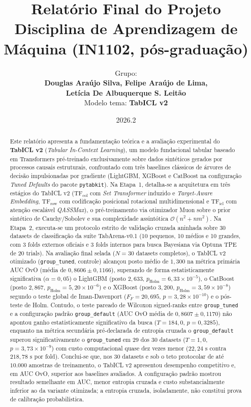 \documentclass[11pt,a4paper]{article}
\title{\bfseries Relatório Final do Projeto\\[0.3em]
       \large Disciplina de Aprendizagem de Máquina (IN1102, pós-graduação)}
\author{Grupo:\\[0.15em]
        \textbf{Douglas Araújo Silva, Felipe Araújo de Lima,}\\
        \textbf{Letícia De Albuquerque S. Leitão}\\[0.2em]
        Modelo tema: \textbf{TabICL v2}}
\date{2026.2}
\begin{document}
\maketitle
\thispagestyle{empty}

\begin{abstract}
\noindent
Este relatório apresenta a fundamentação teórica e a avaliação experimental do \textbf{TabICL v2} (\emph{Tabular In-Context Learning}), um modelo fundacional tabular baseado em Transformers pré-treinado exclusivamente sobre dados sintéticos gerados por processos causais estruturais, confrontado com três baselines clássicos de árvores de decisão impulsionadas por gradiente (LightGBM, XGBoost e CatBoost na configuração \emph{Tuned Defaults} do pacote \texttt{pytabkit}). Na Etapa~1, detalha-se a arquitetura em três estágios do TabICL v2 ($\mathrm{TF}_{\mathrm{col}}$ com \emph{Set Transformer} induzido e \emph{Target-Aware Embedding}, $\mathrm{TF}_{\mathrm{row}}$ com codificação posicional rotacional multidimensional e $\mathrm{TF}_{\mathrm{icl}}$ com atenção escalável \emph{QASSMax}), o pré-treinamento via otimizador Muon sobre o prior sintético de Cauchy/Sobolev e sua complexidade assintótica $\mathcal{O}(n^2 + n m^2)$. Na Etapa~2, executa-se um protocolo estrito de validação cruzada aninhada sobre 30 datasets de classificação da suíte TabArena-v0.1 (10 pequenos, 10 médios e 10 grandes, com 3 folds externos oficiais e 3 folds internos para busca Bayesiana via Optuna TPE de 20 trials). Na avaliação final selada ($N = 30$ datasets completos), o TabICL v2 otimizado (\texttt{group\_tuned}, controle) alcançou posto médio de $1{,}300$ na métrica primária AUC OvO (média de $0{,}8606 \pm 0{,}1166$), superando de forma estatisticamente significativa ($\alpha = 0{,}05$) o LightGBM (posto $2{,}633$, $p_{\text{Holm}} = 6{,}33 \times 10^{-5}$), o CatBoost (posto $2{,}867$, $p_{\text{Holm}} = 5{,}20 \times 10^{-6}$) e o XGBoost (posto $3{,}200$, $p_{\text{Holm}} = 3{,}59 \times 10^{-8}$) segundo o teste global de Iman-Davenport ($F_F = 20{,}695$, $p = 3{,}28 \times 10^{-10}$) e o pós-teste de Holm. Contudo, o teste pareado de Wilcoxon signed-ranks entre \texttt{group\_tuned} e a configuração padrão \texttt{group\_default} (AUC OvO média de $0{,}8607 \pm 0{,}1170$) não apontou ganho estatisticamente significativo da busca ($T = 184{,}0$, $p = 0{,}3285$), enquanto na métrica secundária pré-declarada de entropia cruzada o \texttt{group\_default} superou significativamente o \texttt{group\_tuned} em 29 dos 30 datasets ($T = 1{,}0$, $p = 3{,}73 \times 10^{-9}$) com custo computacional quase dez vezes menor ($22{,}24\text{ s}$ contra $218{,}78\text{ s}$ por fold). Conclui-se que, nos 30 datasets e sob o teto protocolar de até $10.000$ amostras de treinamento, o TabICL v2 apresentou desempenho competitivo e, em AUC OvO, superior aos baselines avaliados. A configuração padrão mostrou resultado semelhante em AUC, menor entropia cruzada e custo substancialmente inferior ao da variante otimizada; a entropia cruzada, isoladamente, não constitui prova de calibração probabilística.
\end{abstract}
\end{document}
